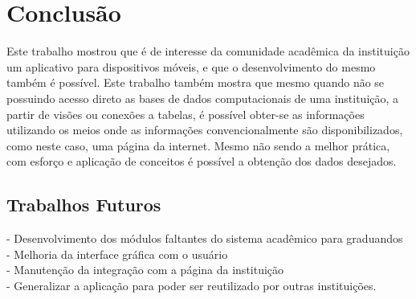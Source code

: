 \chapter{Conclusão}

Este trabalho mostrou que é de interesse da comunidade acadêmica da instituição um aplicativo para dispositivos móveis, e que o desenvolvimento do mesmo também é possível. Este trabalho também mostra que mesmo quando não se possuindo acesso direto as bases de dados computacionais de uma instituição, a partir de visões ou conexões a tabelas, é possível obter-se as informações utilizando os meios onde as informações convencionalmente são disponibilizados, como neste caso, uma página da internet. Mesmo não sendo a melhor prática, com esforço e aplicação de conceitos é possível a obtenção dos dados desejados.

\section{Trabalhos Futuros}

- Desenvolvimento dos módulos faltantes do sistema acadêmico para graduandos \\
- Melhoria da interface gráfica com o usuário \\
- Manutenção da integração com a página da instituição \\
- Generalizar a aplicação para poder ser reutilizado por outras instituições.